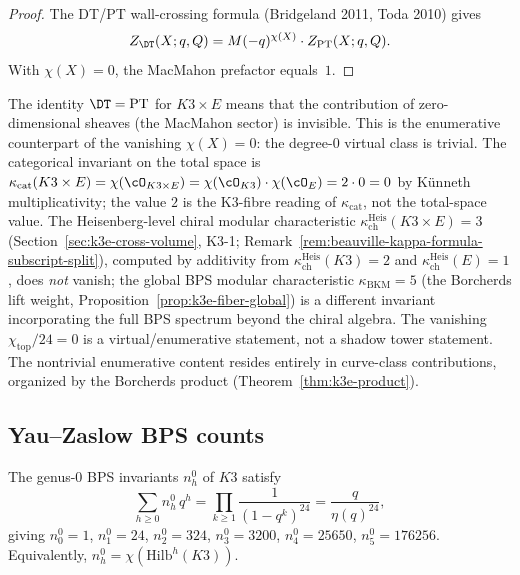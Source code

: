 \begin{proof}
The DT/PT wall-crossing formula (Bridgeland 2011, Toda 2010) gives
\[
 Z_{\DT}(X; q, Q) = M(-q)^{\chi(X)} \cdot Z_{\mathrm{PT}}(X; q, Q).
\]
With $\chi(X) = 0$, the MacMahon prefactor equals~$1$.
\end{proof}

\begin{remark}[Structural content of \texorpdfstring{$\chi = 0$}{chi = 0}]
\label{rem:k3e-chi-zero-structure}
The identity $\DT = \mathrm{PT}$ for $K3 \times E$ means that the contribution of zero-dimensional sheaves (the MacMahon sector) is invisible. This is the enumerative counterpart of the vanishing $\chi(X) = 0$: the degree-$0$ virtual class is trivial. The categorical invariant on the total space is $\kappa_{\mathrm{cat}}(K3 \times E) = \chi(\cO_{K3 \times E}) = \chi(\cO_{K3}) \cdot \chi(\cO_E) = 2 \cdot 0 = 0$ by K\"unneth multiplicativity; the value $2$ is the K3-fibre reading of $\kappa_{\mathrm{cat}}$, not the total-space value. The Heisenberg-level chiral modular characteristic $\kappa_{\mathrm{ch}}^{\mathrm{Heis}}(K3 \times E) = 3$ (Section~\ref{sec:k3e-cross-volume}, K3-1; Remark~\ref{rem:beauville-kappa-formula-subscript-split}), computed by additivity from $\kappa_{\mathrm{ch}}^{\mathrm{Heis}}(K3) = 2$ and $\kappa_{\mathrm{ch}}^{\mathrm{Heis}}(E) = 1$, does \emph{not} vanish; the global BPS modular characteristic $\kappa_{\mathrm{BKM}} = 5$ (the Borcherds lift weight, Proposition~\ref{prop:k3e-fiber-global}) is a different invariant incorporating the full BPS spectrum beyond the chiral algebra. The vanishing $\chi_{\mathrm{top}}/24 = 0$ is a virtual/enumerative statement, not a shadow tower statement. The nontrivial enumerative content resides entirely in curve-class contributions, organized by the Borcherds product (Theorem~\ref{thm:k3e-product}).
\end{remark}

\subsection{Yau--Zaslow BPS counts}
\label{subsec:k3e-yau-zaslow}

\begin{theorem}
\label{thm:k3e-yau-zaslow}
The genus-$0$ BPS invariants $n_h^0$ of $K3$ satisfy
\[
 \sum_{h \geq 0} n_h^0 \, q^h = \prod_{k \geq 1} \frac{1}{(1 - q^k)^{24}} = \frac{q}{\eta(q)^{24}},
\]
giving $n_0^0 = 1$, $n_1^0 = 24$, $n_2^0 = 324$, $n_3^0 = 3200$, $n_4^0 = 25650$, $n_5^0 = 176256$. Equivalently, $n_h^0 = \chi(\mathrm{Hilb}^h(K3))$.
\end{theorem}

